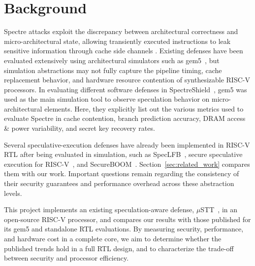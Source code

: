 \section{Background}
\label{sec:background}

Spectre attacks exploit the discrepancy between architectural correctness and 
micro-architectural state, allowing transiently executed instructions to leak 
sensitive information through cache side channels \cite{SpectreBase}. Existing 
defenses have been evaluated extensively using architectural simulators such 
as gem5~\cite{Narayan:HFI:2024}, but simulation abstractions may not fully 
capture the pipeline timing, cache replacement behavior, and hardware resource 
contention of synthesizable RISC-V processors. In evaluating different software 
defenses in SpectreShield~\cite{Khan:SpectreDef:2025}, gem5 was used as the main 
simulation tool to observe speculation behavior on micro-architectural elements. 
Here, they explicitly list out the various metrics used to evaluate Spectre in 
cache contention, branch prediction accuracy, DRAM access \& power variability, 
and secret key recovery rates.

Several speculative-execution defenses have already been implemented in RISC-V 
RTL after being evaluated in simulation, such as SpecLFB~\cite{Cheng:SpecLFB:2024}, 
secure speculative execution for RISC-V~\cite{sabbagh2021secure}, and 
SecureBOOM~\cite{Jauch:SecureBOOM:2023}. Section~\ref{sec:related_work} compares 
them with our work. Important questions remain regarding the consistency of their 
security guarantees and performance overhead across these abstraction levels.

This project implements an existing speculation-aware defense, 
$\mu$STT~\cite{Chen:uSTT:2025}, in an open-source RISC-V processor, and compares 
our results with those published for its gem5 and standalone RTL evaluations. 
By measuring security, performance, and hardware cost in a complete core, we aim 
to determine whether the published trends hold in a full RTL design, and to 
characterize the trade-off between security and processor efficiency.
